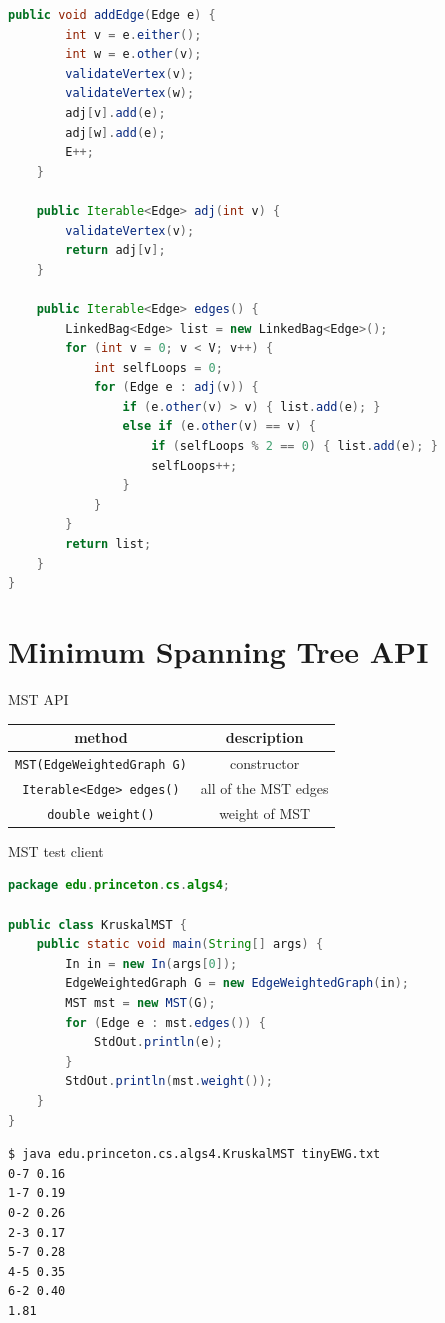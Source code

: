 \documentclass[8pt,a4paper,compress]{beamer}
\begin{document}
\begin{frame}[fragile]
\pause

\begin{lstlisting}[language=Java]
    public void addEdge(Edge e) {
        int v = e.either();
        int w = e.other(v);
        validateVertex(v);
        validateVertex(w);
        adj[v].add(e);
        adj[w].add(e);
        E++;
    }

    public Iterable<Edge> adj(int v) {
        validateVertex(v);
        return adj[v];
    }

    public Iterable<Edge> edges() {
        LinkedBag<Edge> list = new LinkedBag<Edge>();
        for (int v = 0; v < V; v++) {
            int selfLoops = 0;
            for (Edge e : adj(v)) {
                if (e.other(v) > v) { list.add(e); }
                else if (e.other(v) == v) {
                    if (selfLoops % 2 == 0) { list.add(e); }
                    selfLoops++;
                }
            }
        }
        return list;
    }
}
\end{lstlisting}
\end{frame}

\section{Minimum Spanning Tree API}
\begin{frame}[fragile]
\pause

MST API
\begin{center}
\begin{tabular}{cc}
method & description \\ \hline
\lstinline$MST(EdgeWeightedGraph G)$ & constructor \\
\lstinline$Iterable<Edge> edges()$ & all of the MST edges \\
\lstinline$double weight()$ & weight of MST
\end{tabular}  
\end{center}

\pause

MST test client
\begin{lstlisting}[language=Java]
package edu.princeton.cs.algs4;

public class KruskalMST {
    public static void main(String[] args) {
        In in = new In(args[0]);
        EdgeWeightedGraph G = new EdgeWeightedGraph(in);
        MST mst = new MST(G);
        for (Edge e : mst.edges()) { 
            StdOut.println(e);
        }
        StdOut.println(mst.weight());
    }
}
\end{lstlisting}

\pause

\begin{lstlisting}[language={}]
$ java edu.princeton.cs.algs4.KruskalMST tinyEWG.txt
0-7 0.16
1-7 0.19
0-2 0.26
2-3 0.17
5-7 0.28
4-5 0.35
6-2 0.40
1.81
\end{lstlisting}
\end{frame}
\end{document}
